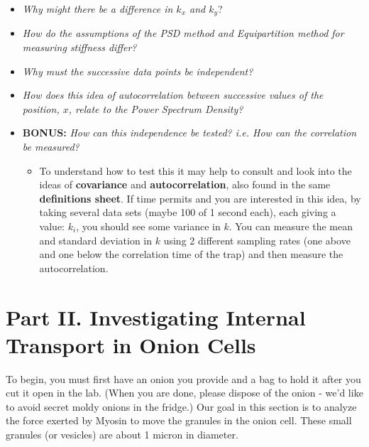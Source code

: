 \documentclass{../lab}
\begin{document}
\begin{itemize}
    \item \emph{Why might there be a difference in $k_x$ and $k_y$}?

    \item \emph{How do the assumptions of the PSD method and Equipartition method for measuring stiffness differ?}

    \item \emph{Why must the successive data points be independent?}

    \item \emph{How does this idea of autocorrelation between successive values of the position, $x$, relate to the Power Spectrum Density?}

    \item \textbf{BONUS:} \emph{How can this independence be tested? i.e. How can the correlation be measured?}

    \begin{itemize}
        \item To understand how to test this it may help to consult \cite{Reif} and look into the ideas of \textbf{covariance} and \textbf{autocorrelation}, also found in the same \textbf{definitions sheet}. If time permits and you are interested in this idea, by taking several data sets (maybe 100 of 1 second each), each giving a value: $k_i$, you should see some variance in $k$. You can measure the mean and standard deviation in $k$ using 2 different sampling rates (one above and one below the correlation time of the trap) and then measure the autocorrelation.
    \end{itemize}

\end{itemize}

\section{Part II. Investigating Internal Transport in Onion Cells}

To begin, you must first have an onion you provide and a bag to hold it after you cut it open in the lab. (When you are done, please dispose of the onion - we'd like to avoid secret moldy onions in the fridge.)
Our goal in this section is to analyze the force exerted by Myosin to move the granules in the onion cell. These small granules (or vesicles) are about 1 micron in diameter.
\end{document}
